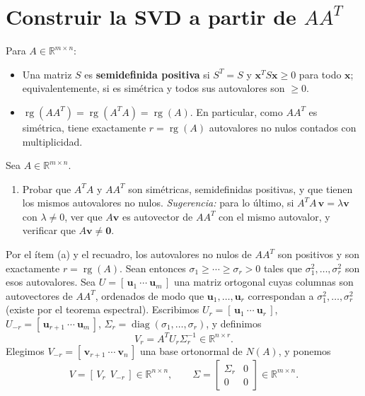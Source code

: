 \documentclass[11pt,a4paper]{article}
\newcommand{\R}{\mathbb{R}}
\newcommand{\bi}[1]{\boldsymbol{#1}}
\DeclareMathOperator{\rg}{rg}
\DeclareMathOperator{\diag}{diag}
\begin{document}
\section{Construir la SVD a partir de \texorpdfstring{$AA^T$}{AAT}}

\begin{manojo}
Para $A\in\R^{m\times n}$:
\begin{itemize}[leftmargin=*,itemsep=1pt,topsep=2pt]
\item Una matriz $S$ es \textbf{semidefinida positiva} si $S^T=S$ y
$\bi x^TS\bi x\ge0$ para todo $\bi x$; equivalentemente, si es simétrica y
todos sus autovalores son $\ge0$.
\item $\rg(AA^T)=\rg(A^TA)=\rg(A)$. En particular, como $AA^T$ es simétrica,
tiene exactamente $r=\rg(A)$ autovalores no nulos contados con multiplicidad.
\end{itemize}
\end{manojo}

\noindent Sea $A\in\R^{m\times n}$.

\begin{enumerate}[label=\textbf{(\alph*)},itemsep=4pt,topsep=4pt]
\item Probar que $A^TA$ y $AA^T$ son simétricas, semidefinidas positivas, y
que tienen los mismos autovalores no nulos. \emph{Sugerencia:} para lo
último, si $A^TA\,\bi v=\lambda\bi v$ con $\lambda\neq0$, ver que $A\bi v$ es
autovector de $AA^T$ con el mismo autovalor, y verificar que
$A\bi v\neq\bi 0$.
\end{enumerate}

\medskip
\noindent
Por el ítem (a) y el recuadro, los autovalores no nulos de $AA^T$ son
positivos y son exactamente $r=\rg(A)$. Sean entonces
$\sigma_1\ge\cdots\ge\sigma_r>0$ tales que $\sigma_1^2,\dots,\sigma_r^2$ son
esos autovalores. Sea $U=[\,\bi u_1\ \cdots\ \bi u_m\,]$ una matriz ortogonal
cuyas columnas son autovectores de $AA^T$, ordenados de modo que
$\bi u_1,\dots,\bi u_r$ correspondan a $\sigma_1^2,\dots,\sigma_r^2$ (existe
por el teorema espectral). Escribimos $U_r=[\,\bi u_1\ \cdots\ \bi u_r\,]$,
$U_{-r}=[\,\bi u_{r+1}\ \cdots\ \bi u_m\,]$,
$\Sigma_r=\diag(\sigma_1,\dots,\sigma_r)$, y definimos
\[
V_r=A^TU_r\Sigma_r^{-1}\in\R^{n\times r} .
\]
Elegimos $V_{-r}=[\,\bi v_{r+1}\ \cdots\ \bi v_n\,]$ una base ortonormal de
$N(A)$, y ponemos
\[
V=[\,V_r\ \ V_{-r}\,]\in\R^{n\times n},
\qquad
\Sigma=\begin{bmatrix}\Sigma_r&0\\ 0&0\end{bmatrix}\in\R^{m\times n} .
\]
\end{document}
